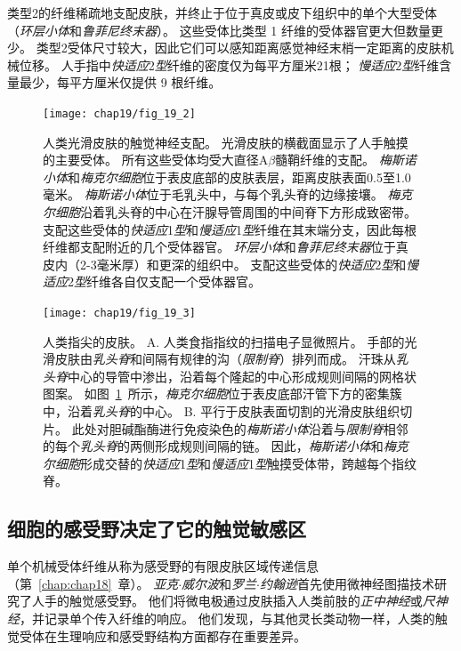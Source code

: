 类型2的纤维稀疏地支配皮肤，并终止于位于真皮或皮下组织中的单个大型受体（\textit{环层小体}和\textit{鲁菲尼终末器}）。 
这些受体比类型 1 纤维的受体器官更大但数量更少。
类型2受体尺寸较大，因此它们可以感知距离感觉神经末梢一定距离的皮肤机械位移。
人手指中\textit{快适应}2\textit{型}纤维的密度仅为每平方厘米21根；
\textit{慢适应}2\textit{型}纤维含量最少，每平方厘米仅提供 9 根纤维。


\begin{figure}[htbp]
	\centering
	\texttt{[image: chap19/fig\_19\_2]}
	\caption{人类光滑皮肤的触觉神经支配。
		光滑皮肤的横截面显示了人手触摸的主要受体。
		所有这些受体均受大直径A$\beta$髓鞘纤维的支配。
		\textit{梅斯诺小体}和\textit{梅克尔细胞}位于表皮底部的皮肤表层，距离皮肤表面0.5至1.0毫米。
		\textit{梅斯诺小体}位于毛乳头中，与每个乳头脊的边缘接壤。
		\textit{梅克尔细胞}沿着乳头脊的中心在汗腺导管周围的中间脊下方形成致密带。
		支配这些受体的\textit{快适应}1\textit{型}和\textit{慢适应}1\textit{型}纤维在其末端分支，因此每根纤维都支配附近的几个受体器官。
		\textit{环层小体}和\textit{鲁菲尼终末器}位于真皮内（2-3毫米厚）和更深的组织中。
		支配这些受体的\textit{快适应}2\textit{型}和\textit{慢适应}2\textit{型}纤维各自仅支配一个受体器官。}
	\label{fig:19_2}
\end{figure}


\begin{figure}[htbp]
	\centering
	\texttt{[image: chap19/fig\_19\_3]}
	\caption{人类指尖的皮肤。
		A. 人类食指指纹的扫描电子显微照片。
		手部的光滑皮肤由\textit{乳头脊}和间隔有规律的沟（\textit{限制脊}）排列而成。
		汗珠从\textit{乳头脊}中心的导管中渗出，沿着每个隆起的中心形成规则间隔的网格状图案。
		如图~\ref{fig:19_2}~所示，\textit{梅克尔细胞}位于表皮底部汗管下方的密集簇中，沿着\textit{乳头脊}的中心。
		 B. 平行于皮肤表面切割的光滑皮肤组织切片。
		 此处对胆碱酯酶进行免疫染色的\textit{梅斯诺小体}沿着与\textit{限制脊}相邻的每个\textit{乳头脊}的两侧形成规则间隔的链。
		 因此，\textit{梅斯诺小体}和\textit{梅克尔细胞}形成交替的\textit{快适应}1\textit{型}和\textit{慢适应}1\textit{型}触摸受体带，跨越每个指纹脊\cite{bolanowski2003organization}。}
	\label{fig:19_3}
\end{figure}



\subsection{细胞的感受野决定了它的触觉敏感区}

单个机械受体纤维从称为感受野的有限皮肤区域传递信息（第~\ref{chap:chap18}~章）。
\textit{亚克$\cdot$威尔波}和\textit{罗兰$\cdot$约翰逊}首先使用微神经图描技术研究了人手的触觉感受野。
他们将微电极通过皮肤插入人类前肢的\textit{正中神经}或\textit{尺神经}，并记录单个传入纤维的响应。
他们发现，与其他灵长类动物一样，人类的触觉受体在生理响应和感受野结构方面都存在重要差异。


